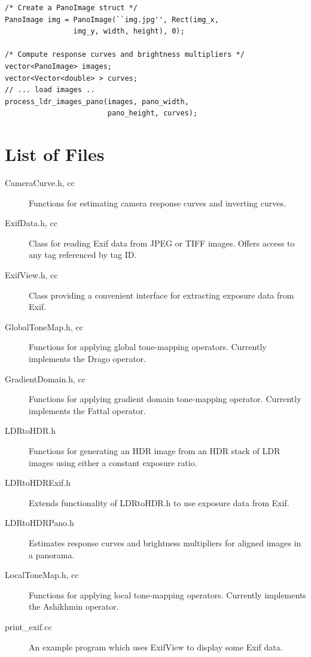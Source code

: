 \begin{verbatim}
/* Create a PanoImage struct */
PanoImage img = PanoImage(``img.jpg'', Rect(img_x,
                img_y, width, height), 0);

/* Compute response curves and brightness multipliers */
vector<PanoImage> images;
vector<Vector<double> > curves;
// ... load images ..
process_ldr_images_pano(images, pano_width,
                        pano_height, curves);
\end{verbatim}

\section{List of Files}
\begin{description}
\item[CameraCurve.h, cc] Functions for estimating camera response curves and inverting curves.
\item[ExifData.h, cc] Class for reading Exif data from JPEG or TIFF images. Offers access to
any tag referenced by tag ID.
\item[ExifView.h, cc] Class providing a convenient interface for extracting exposure data
from Exif.
\item[GlobalToneMap.h, cc] Functions for applying global tone-mapping operators. Currently
implements the Drago operator.
\item[GradientDomain.h, cc] Functions for applying gradient domain tone-mapping operator.
Currently implements the Fattal operator.
\item[LDRtoHDR.h] Functions for generating an HDR image from an HDR stack of LDR images
using either a constant exposure ratio.
\item[LDRtoHDRExif.h] Extends functionality of LDRtoHDR.h to use exposure data from Exif.
\item[LDRtoHDRPano.h] Estimates response curves and brightness multipliers for aligned
images in a panorama.
\item[LocalToneMap.h, cc] Functions for applying local tone-mapping operators. Currently
implements the Ashikhmin operator.
\item[print\_exif.cc] An example program which uses ExifView to display some Exif data.
\end{description}

